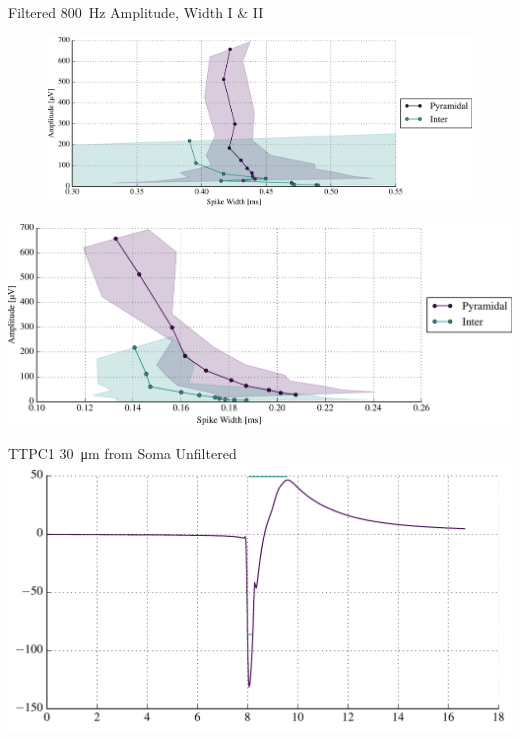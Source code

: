 \documentclass{beamer}
\begin{document}
\begin{frame}{Filtered \SI{800}{\hertz} Amplitude, Width I \& II}{}
    \centering
    \begin{figure}
    \includegraphics[height=0.4\textheight]{images/filt800_amps_widths_I_all.pdf}\\
    \end{figure}
    \includegraphics[height=0.4\textheight]{images/filt800_amps_widths_II_all.pdf}
\end{frame}

\begin{frame}{TTPC1 \SI{30}{\micro\metre} from Soma Unfiltered }{}
    \centering
    \includegraphics[width=1.0\textwidth]{images/sym_middle_elec_spike.pdf}
\end{frame}
\end{document}

